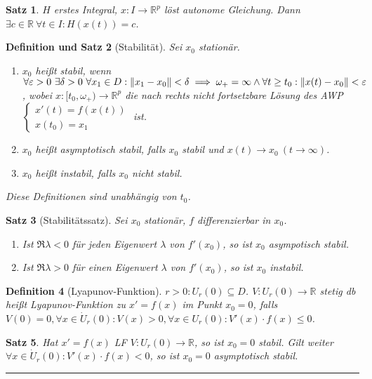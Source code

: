 \documentclass[a4paper]{article}
\newcounter{Sec}
\theoremstyle{marginbreak}
\newtheorem{definition}{Definition}[Sec]
\newtheorem{satz}[definition]{Satz}
\newtheorem{defsatz}[definition]{Definition und Satz}
\newcommand{\sep}{%
	\rule{\textwidth}{0.3pt}%
	\stepcounter{Sec}%
	}
\newcommand{\R}{\mathbb{R}}
\begin{document}
	\begin{satz}
		$H$ erstes Integral, $x\colon I\to\R^p$ löst autonome Gleichung. Dann $\exists c\in\R~\forall t\in I: H(x(t)) = c$.
	\end{satz}
	\begin{defsatz}[Stabilität]
		Sei $x_0$ stationär.
		\begin{enumerate}[label=(\alph*)]
			\item $x_0$ heißt stabil, wenn $\forall\varepsilon>0~\exists\delta>0~\forall x_1\in D:
				\norm{x_1-x_0}<\delta\implies \omega_+=\infty\wedge\forall t\geq t_0:\norm{x(t)-x_0}<\varepsilon$,
				wobei $x\colon [t_0,\omega_+)\to\R^p$ die nach rechts nicht fortsetzbare Lösung des AWP
				$\begin{cases}x'(t)=f(x(t))\\x(t_0)=x_1\end{cases}$ ist.
			\item $x_0$ heißt asymptotisch stabil, falls $x_0$ stabil und $x(t)\to x_0~(t\to\infty)$.
			\item $x_0$ heißt instabil, falls $x_0$ nicht stabil.
		\end{enumerate}
		Diese Definitionen sind unabhängig von $t_0$.
	\end{defsatz}
	\begin{satz}[Stabilitätssatz] %
		Sei $x_0$ stationär, $f$ differenzierbar in $x_0$.
		\begin{enumerate}[label=(\alph*)]
			\item Ist $\Re\lambda<0$ für \emph{jeden}
				Eigenwert $\lambda$ von $f'(x_0)$, so ist $x_0$ asympotisch stabil.
			\item Ist $\Re\lambda>0$ für \emph{einen} Eigenwert $\lambda$ von $f'(x_0)$, so ist
				$x_0$ instabil.
		\end{enumerate}
	\end{satz}
	\begin{definition}[Lyapunov-Funktion]
		$r>0: U_r(0)\subseteq D$. $V\colon U_r(0)\to\R$ stetig db heißt Lyapunov-Funktion
		zu $x'=f(x)$ im Punkt $x_0=0$, falls $V(0)=0, \forall x\in \dot{U}_r(0): V(x)>0,
		\forall x\in U_r(0): V'(x)\cdot f(x)\leq 0$.
	\end{definition}
	\begin{satz}
		Hat $x'=f(x)$ LF $V\colon U_r(0)\to\R$, so ist $x_0=0$ stabil. Gilt weiter
		$\forall x\in\dot{U}_r(0): V'(x)\cdot f(x)<0$, so ist $x_0=0$ asymptotisch stabil.
	\end{satz}
	\sep
\end{document}
